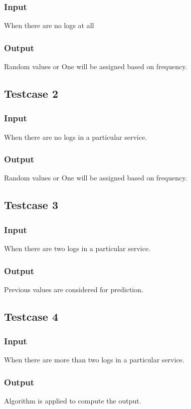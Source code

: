 \subsubsection{Input}
When there are no logs at all
\subsubsection{Output}
Random values or One will be assigned based on frequency.
\subsection{Testcase 2}
\subsubsection{Input}
When there are no logs in a particular service.
\subsubsection{Output}
Random values or One will be assigned based on frequency.
\subsection{Testcase 3}
\subsubsection{Input}
When there are two logs in a particular service.
\subsubsection{Output}
Previous values are considered for prediction.
\subsection{Testcase 4}
\subsubsection{Input}
When there are more than two logs in a particular service.
\subsubsection{Output}
Algorithm is applied to compute the output.




